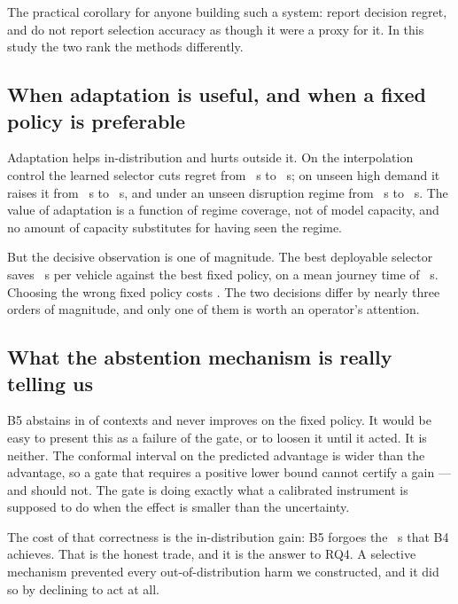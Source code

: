 The practical corollary for anyone building such a system: report decision
regret, and do not report selection accuracy as though it were a proxy for it.
In this study the two rank the methods differently.

\subsection{When adaptation is useful, and when a fixed policy is preferable}

Adaptation helps in-distribution and hurts outside it. On the interpolation
control the learned selector cuts regret from \NumOODThreeMidBZero~s to
\NumOODThreeMidBFour~s; on unseen high demand it raises it from
\NumOODOneHighBZero~s to \NumOODOneHighBFour~s, and under an unseen disruption
regime from \NumOODSevenIncBZero~s to \NumOODSevenIncBFour~s. The value of
adaptation is a function of regime coverage, not of model capacity, and no
amount of capacity substitutes for having seen the regime.

But the decisive observation is one of magnitude. The best deployable selector
saves \NumBFourVsBZero~s per vehicle against the best fixed policy, on a mean
journey time of \NumFixedCostPThree~s. Choosing the wrong fixed policy costs
\NumFixedWorstPenaltyPct{}. The two decisions differ by nearly three orders of
magnitude, and only one of them is worth an operator's attention.

\subsection{What the abstention mechanism is really telling us}

B5 abstains in \NumAbstainRate{} of contexts and never improves on the fixed
policy. It would be easy to present this as a failure of the gate, or to loosen
it until it acted. It is neither. The conformal interval on the predicted
advantage is wider than the advantage, so a gate that requires a positive lower
bound cannot certify a gain --- and should not. The gate is doing exactly what a
calibrated instrument is supposed to do when the effect is smaller than the
uncertainty.

The cost of that correctness is the in-distribution gain: B5 forgoes the
\NumBFourVsBZero~s that B4 achieves. That is the honest trade, and it is the
answer to RQ4. A selective mechanism prevented every out-of-distribution harm we
constructed, and it did so by declining to act at all.

